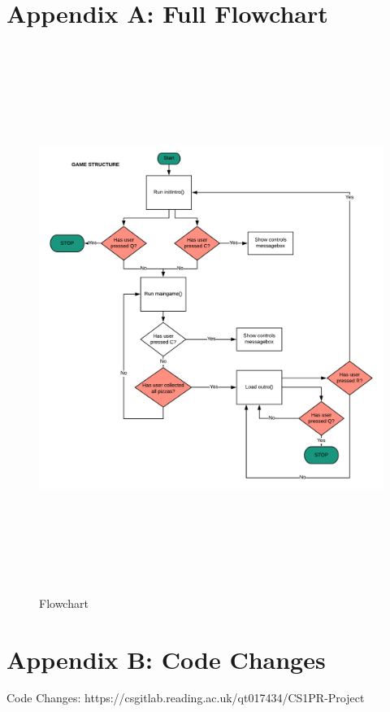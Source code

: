 \documentclass{article}
\begin{document}
\section{Appendix A: Full Flowchart}
\begin{figure}[H]
    \centering
    \includegraphics[height=7in]{flowchartfull.png}
    \caption[Flowchart]{Flowchart}
    \label{fig:Flowchart}
\end{figure}

\section{Appendix B: Code Changes}
Code Changes: https://csgitlab.reading.ac.uk/qt017434/CS1PR-Project


\end{document}
